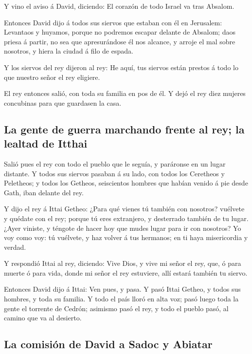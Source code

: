  Y vino el aviso á David, diciendo: El corazón de todo
Israel va tras Absalom.

 Entonces David dijo á todos sus siervos que estaban con
él en Jerusalem: Levantaos y huyamos, porque no podremos escapar delante
de Absalom; daos priesa á partir, no sea que apresurándose él nos
alcance, y arroje el mal sobre nosotros, y hiera la ciudad á filo de
espada.

 Y los siervos del rey dijeron al rey: He aquí, tus
siervos están prestos á todo lo que nuestro señor el rey eligiere.

 El rey entonces salió, con toda su familia en pos de él.
Y dejó el rey diez mujeres concubinas para que guardasen la casa.

\hypertarget{la-gente-de-guerra-marchando-frente-al-rey-la-lealtad-de-itthai}{%
\subsection{La gente de guerra marchando frente al rey; la lealtad de
Itthai}\label{la-gente-de-guerra-marchando-frente-al-rey-la-lealtad-de-itthai}}

 Salió pues el rey con todo el pueblo que le seguía, y
paráronse en un lugar distante.  Y todos sus siervos
pasaban á su lado, con todos los Ceretheos y Peletheos; y todos los
Getheos, seiscientos hombres que habían venido á pie desde Gath, iban
delante del rey.

 Y dijo el rey á Ittai Getheo: ¿Para qué vienes tú
también con nosotros? vuélvete y quédate con el rey; porque tú eres
extranjero, y desterrado también de tu lugar.  ¿Ayer
viniste, y téngote de hacer hoy que mudes lugar para ir con nosotros? Yo
voy como voy: tú vuélvete, y haz volver á tus hermanos; en ti haya
misericordia y verdad.

 Y respondió Ittai al rey, diciendo: Vive Dios, y vive mi
señor el rey, que, ó para muerte ó para vida, donde mi señor el rey
estuviere, allí estará también tu siervo.

 Entonces David dijo á Ittai: Ven pues, y pasa. Y pasó
Ittai Getheo, y todos sus hombres, y toda su familia.  Y
todo el país lloró en alta voz; pasó luego toda la gente el torrente de
Cedrón; asimismo pasó el rey, y todo el pueblo pasó, al camino que va al
desierto.

\hypertarget{la-comisiuxf3n-de-david-a-sadoc-y-abiatar}{%
\subsection{La comisión de David a Sadoc y
Abiatar}\label{la-comisiuxf3n-de-david-a-sadoc-y-abiatar}}

